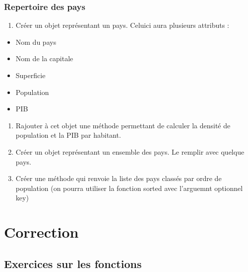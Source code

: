 \documentclass[letterpaper,10pt,english]{sphinxhowto}
\begin{document}
\subsubsection{Repertoire des pays}
\label{\detokenize{exercices_geographie:repertoire-des-pays}}\begin{enumerate}
%
\item {} 
\sphinxAtStartPar
Créer un objet représentant un pays. Celui\sphinxhyphen{}ci aura plusieurs attributs :

\end{enumerate}
\begin{itemize}
\item {} 
\sphinxAtStartPar
Nom du pays

\item {} 
\sphinxAtStartPar
Nom de la capitale

\item {} 
\sphinxAtStartPar
Superficie

\item {} 
\sphinxAtStartPar
Population

\item {} 
\sphinxAtStartPar
PIB

\end{itemize}
\begin{enumerate}
%
\setcounter{enumi}{1}
\item {} 
\sphinxAtStartPar
Rajouter à cet objet une méthode permettant de calculer la densité de population et la PIB par habitant.

\item {} 
\sphinxAtStartPar
Créer un objet représentant un ensemble des pays. Le remplir avec quelque pays.

\item {} 
\sphinxAtStartPar
Créer une méthode qui renvoie la liste des pays classés par ordre de population (on pourra utiliser la fonction sorted avec l’arguemnt optionnel key)

\end{enumerate}


\section{Correction}
\label{\detokenize{correction:correction}}\label{\detokenize{correction::doc}}

\subsection{Exercices sur les fonctions}
\label{\detokenize{cours1_fonctions_corr_exercices:exercices-sur-les-fonctions}}\label{\detokenize{cours1_fonctions_corr_exercices::doc}}
\end{document}
